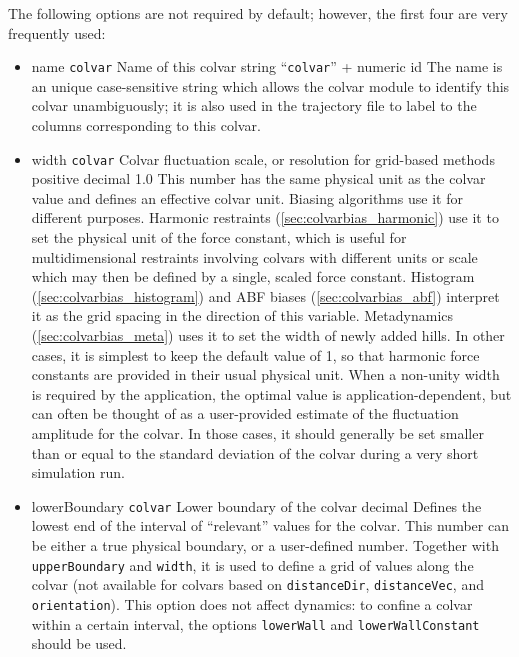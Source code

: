 \label{sec:colvar_general}
The following options are not required by default; however, the first four are very  frequently used:
\begin{itemize}

\item %
  \keydef
    {name}{%
    \texttt{colvar}}{%
    Name of this colvar}{%
    string}{%
    ``\texttt{colvar}'' + numeric id}{%
    The name is an unique case-sensitive string which allows the
    colvar module to identify this colvar unambiguously; it is also
    used in the trajectory file to label to the columns corresponding
    to this colvar.}

\item %
  \keydef
    {width}{%
    \texttt{colvar}}{%
    Colvar fluctuation scale, or resolution for grid-based methods}{%
    positive decimal}{%
    1.0}{%
    This number has the same physical unit as the colvar value and defines an effective colvar unit.
    Biasing algorithms use it for different purposes.
    Harmonic restraints (\ref{sec:colvarbias_harmonic}) use it to set the physical unit of the force constant, which is useful for multidimensional restraints involving colvars with different units or scale which may then be defined by a single, scaled force constant.
    Histogram (\ref{sec:colvarbias_histogram}) and ABF biases (\ref{sec:colvarbias_abf}) interpret it as the grid spacing in the direction of this variable.
    Metadynamics (\ref{sec:colvarbias_meta}) uses it to set the width of newly added hills.
    In other cases, it is simplest to keep the default value of 1, so that harmonic force constants are provided in their usual physical unit.
    When a non-unity width is required by the application, the optimal value is application-dependent, but can often be thought of as a user-provided estimate of the fluctuation amplitude for the colvar.
    In those cases, it should generally be set smaller than or equal to the standard deviation of the colvar during a very short simulation run.}

\item %
  \key
    {lowerBoundary}{%
    \texttt{colvar}}{%
    Lower boundary of the colvar}{%
    decimal}{%
    Defines the lowest end of the interval of ``relevant'' values for the colvar.
    This number can be either a true physical boundary, or a user-defined number.  
    Together with \texttt{upperBoundary} and \texttt{width}, it is used to define a grid of values along the colvar (not available for colvars based on \texttt{distanceDir}, \texttt{distanceVec}, and \texttt{orientation}).
    This option does not affect dynamics: to confine a colvar within a certain interval, the options \texttt{lowerWall} and \texttt{lowerWallConstant} should be used.
}


\end{itemize}
